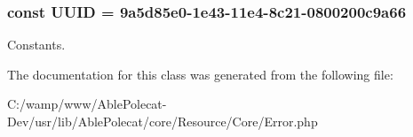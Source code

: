 \subsubsection[{U\+U\+I\+D}]{\setlength{\rightskip}{0pt plus 5cm}const U\+U\+I\+D = \textquotesingle{}9a5d85e0-\/1e43-\/11e4-\/8c21-\/0800200c9a66\textquotesingle{}}\label{class_able_polecat___resource___core___error_a74b892c8c0b86bf9d04c5819898c51e7}
Constants. 

The documentation for this class was generated from the following file\+:\begin{DoxyCompactItemize}
\item 
C\+:/wamp/www/\+Able\+Polecat-\/\+Dev/usr/lib/\+Able\+Polecat/core/\+Resource/\+Core/Error.\+php\end{DoxyCompactItemize}
